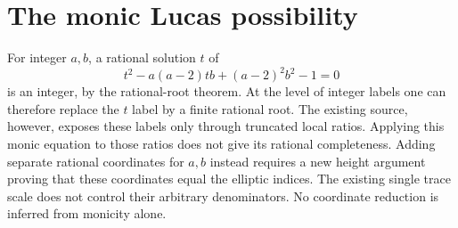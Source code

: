 \documentclass[11pt]{article}
\begin{document}
\section*{The monic Lucas possibility}

For integer $a,b$, a rational solution $t$ of
\[
 t^2-a(a-2)tb+(a-2)^2b^2-1=0
\]
is an integer, by the rational-root theorem. At the level of integer
labels one can therefore replace the $t$ label by a finite rational
root. The existing source, however, exposes these labels only through
truncated local ratios. Applying this monic equation to those ratios
does not give its rational completeness. Adding separate rational
coordinates for $a,b$ instead requires a new height argument proving
that these coordinates equal the elliptic indices. The existing
single trace scale does not control their arbitrary denominators.
No coordinate reduction is inferred from monicity alone.
\end{document}
